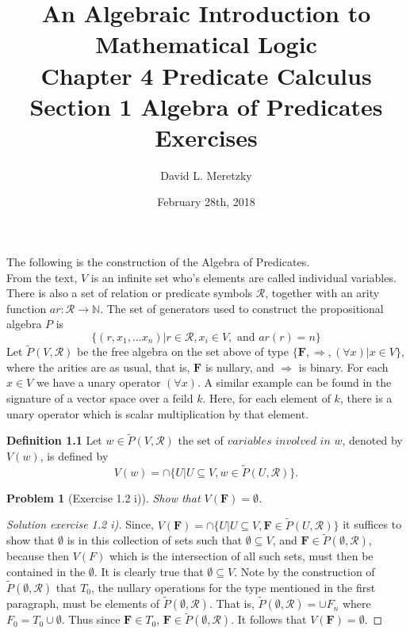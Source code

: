 \documentclass{article}
\title{ \vspace{-10ex} %
An Algebraic Introduction to Mathematical Logic\\
Chapter 4 Predicate Calculus \\
Section 1 Algebra of Predicates \\
Exercises 
}
\author{David L. Meretzky
}
\date{%
February 28th, 2018
}
\theoremstyle{problemstyle}
\newtheorem{problem}{Problem}
\begin{document}
\maketitle




The following is the construction of the Algebra of Predicates.\\

From the text, $V$ is an infinite set who's elements are called individual variables. There is also a set of relation or predicate symbols $\mathscr{R}$, together with an arity function $ar:\mathscr{R}\rightarrow \mathbb{N}$.  The set of generators used to construct the propositional algebra $P$ is $$\{(r,x_1,...x_n)|r \in \mathscr{R}, x_i \in V, \text{ and }ar(r) = n\}$$ Let $\widetilde{P}(V,\mathscr{R})$ be the free algebra on the set above of type $\{\textbf{F}, \Rightarrow,(\forall x)|x \in V\}$, where the arities are as usual, that is, $\textbf{F}$ is nullary, and $\Rightarrow$ is binary.  For each $x \in V$ we have a unary operator $(\forall x)$. A similar example can be found in the signature of a vector space over a feild $k$. Here, for each element of $k$, there is a unary operator which is scalar multiplication by that element. 

\begin{flushleft}
\textbf{Definition 1.1} Let $w \in \widetilde{P}(V,\mathscr{R})$ the set of $variables$ $involved$ $in$ $w$, denoted by $V(w)$, is defined by $$V(w) = \cap\{U|U \subseteq V, w\in \widetilde{P}(U,\mathscr{R})\}.$$
\end{flushleft}

\begin{problem}[Exercise 1.2 i)] 
Show that $V(\textbf{F}) = \emptyset$.
\end{problem}

\begin{proof}[Solution exercise 1.2 i)]
Since, $V(\textbf{F}) = \cap\{U|U \subseteq V, \textbf{F} \in \widetilde{P}(U,\mathscr{R})\}$ it suffices to show that $\emptyset$ is in this collection of sets such that $\emptyset \subseteq V$, and $\textbf{F} \in \widetilde{P}(\emptyset,\mathscr{R})$, because then $V(F)$ which is the intersection of all such sets, must then be contained in the $\emptyset$. It is clearly true that $\emptyset \subseteq V$. Note by the construction of $\widetilde{P}(\emptyset,\mathscr{R})$ that $T_0$, the nullary operations for the type mentioned in the first paragraph, must be elements of $\widetilde{P}(\emptyset,\mathscr{R})$. That is, $\widetilde{P}(\emptyset,\mathscr{R}) = \cup F_n$ where $F_0 = T_0 \cup \emptyset$. Thus since $\textbf{F} \in T_0$, $\textbf{F} \in \widetilde{P}(\emptyset,\mathscr{R})$. It follows that $V(\textbf{F}) = \emptyset$.
\end{proof}
\end{document}
